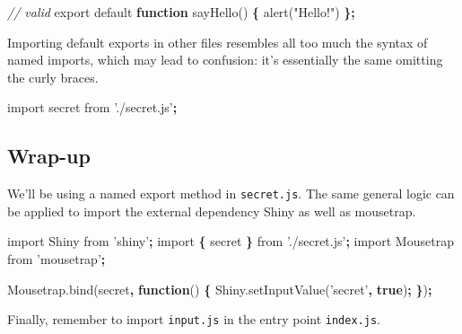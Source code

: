 \documentclass[10pt,]{krantz}
\makeatletter
\newenvironment{Shaded}{\begin{snugshade}}{\end{snugshade}}
\newcommand{\AttributeTok}[1]{\textcolor[rgb]{0.61,0.61,0.61}{#1}}
\newcommand{\CommentTok}[1]{\textcolor[rgb]{0.37,0.37,0.37}{\textit{#1}}}
\newcommand{\ImportTok}[1]{#1}
\newcommand{\KeywordTok}[1]{\textcolor[rgb]{0.27,0.27,0.27}{\textbf{#1}}}
\newcommand{\NormalTok}[1]{#1}
\newcommand{\OperatorTok}[1]{\textcolor[rgb]{0.43,0.43,0.43}{\textbf{#1}}}
\newcommand{\StringTok}[1]{\textcolor[rgb]{0.5,0.5,0.5}{#1}}
\newcommand{\VariableTok}[1]{\textcolor[rgb]{0,0,0}{#1}}
\newenvironment{kframe}{%
\medskip{}
\setlength{\fboxsep}{.8em}
 \def\at@end@of@kframe{}%
 \ifinner\ifhmode%
  \def\at@end@of@kframe{\end{minipage}}%
  \begin{minipage}{\columnwidth}%
 \fi\fi%
 \def\FrameCommand##1{\hskip\@totalleftmargin \hskip-\fboxsep
 \colorbox{shadecolor}{##1}\hskip-\fboxsep
     \hskip-\linewidth \hskip-\@totalleftmargin \hskip\columnwidth}%
 \MakeFramed {\advance\hsize-\width
   \@totalleftmargin\z@ \linewidth\hsize
   \@setminipage}}%
 {\par\unskip\endMakeFramed%
 \at@end@of@kframe}
\renewenvironment{Shaded}{\begin{kframe}}{\end{kframe}}
\makeatother
\begin{document}
\begin{Shaded}
\begin{Highlighting}[]
\CommentTok{// valid}
\ImportTok{export} \ImportTok{default} \KeywordTok{function} \AttributeTok{sayHello}\NormalTok{() }\OperatorTok{\{}
  \AttributeTok{alert}\NormalTok{(}\StringTok{"Hello!"}\NormalTok{)}
\OperatorTok{\};}
\end{Highlighting}
\end{Shaded}

Importing default exports in other files resembles all too much the syntax of named imports, which may lead to confusion: it's essentially the same omitting the curly braces.

\begin{Shaded}
\begin{Highlighting}[]
\ImportTok{import}\NormalTok{ secret }\ImportTok{from} \StringTok{'./secret.js'}\OperatorTok{;}
\end{Highlighting}
\end{Shaded}

\hypertarget{webpack-intro-import-export-wrap-up}{%
\subsection{Wrap-up}\label{webpack-intro-import-export-wrap-up}}

We'll be using a named export method in \texttt{secret.js}. The same general logic can be applied to import the external dependency Shiny as well as mousetrap.

\begin{Shaded}
\begin{Highlighting}[]
\ImportTok{import}\NormalTok{ Shiny }\ImportTok{from} \StringTok{'shiny'}\OperatorTok{;}
\ImportTok{import} \OperatorTok{\{}\NormalTok{ secret }\OperatorTok{\}} \ImportTok{from} \StringTok{'./secret.js'}\OperatorTok{;}
\ImportTok{import}\NormalTok{ Mousetrap }\ImportTok{from} \StringTok{'mousetrap'}\OperatorTok{;}

\VariableTok{Mousetrap}\NormalTok{.}\AttributeTok{bind}\NormalTok{(secret}\OperatorTok{,} \KeywordTok{function}\NormalTok{() }\OperatorTok{\{} 
  \VariableTok{Shiny}\NormalTok{.}\AttributeTok{setInputValue}\NormalTok{(}\StringTok{'secret'}\OperatorTok{,} \KeywordTok{true}\NormalTok{)}\OperatorTok{;}
\OperatorTok{\}}\NormalTok{)}\OperatorTok{;}
\end{Highlighting}
\end{Shaded}

Finally, remember to import \texttt{input.js} in the entry point \texttt{index.js}.
\end{document}
